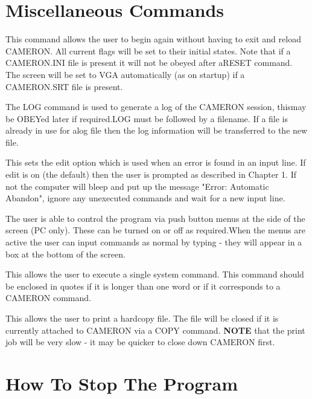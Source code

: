 \documentclass[10pt,a4paper]{report}
\begin{document}
\chapter{Miscellaneous Commands}

\bigskip{}

This command allows the user to begin again without having to exit and reload CAMERON. All current flags will be set to their initial states. Note that if a CAMERON.INI file is present it will not be obeyed after aRESET command. The screen will be set to VGA automatically (as on startup) if a CAMERON.SRT file is present.

\bigskip{}

The LOG command is used to generate a log of the CAMERON session, thismay be OBEYed later if required.LOG must be followed by a filename. If a file is already in use for alog file then the log information will be transferred to the new file.

\bigskip{}



\bigskip{}

\bigskip{}This sets the edit option which is used when an error is found in an input line. If edit is on (the default) then the user is prompted as described in Chapter 1. If not the computer will bleep and put up the message "Error: Automatic Abandon", ignore any unexecuted commands and wait for a new input line.

\bigskip{}



\bigskip{}

\bigskip{}The user is able to control the program via push button menus at the side of the screen (PC only). These can be turned on or off as required.When the menus are active the user can input commands as normal by typing - they will appear in a box at the bottom of the screen.

\bigskip{}

This allows the user to execute a single system command. This command should be enclosed in quotes if it is longer than one word or if it corresponds to a CAMERON command.

\bigskip{}

This allows the user to print a hardcopy file. The file will be closed if it is currently attached to CAMERON via a COPY command. {\bf NOTE} that the print job will be very slow - it may be quicker to close down CAMERON first.\chapter{How To Stop The Program}
\end{document}
